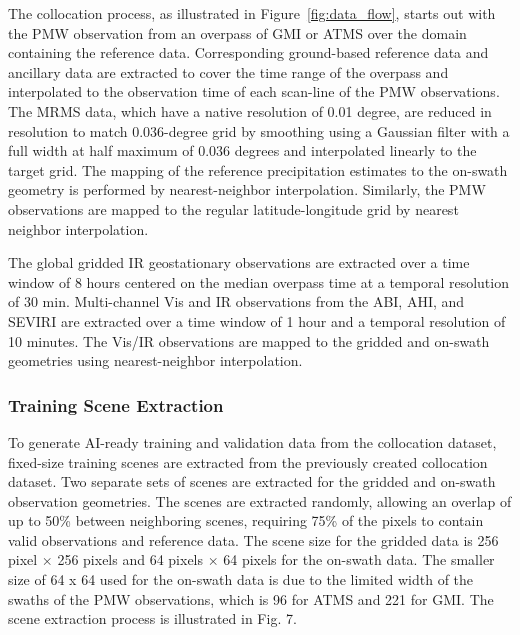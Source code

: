 \documentclass[11pt]{article}
\begin{document}
The collocation process, as illustrated in Figure~\ref{fig:data_flow}, starts
out with the PMW observation from an overpass of GMI or ATMS over the domain
containing the reference data. Corresponding ground-based reference data and
ancillary data are extracted to cover the time range of the overpass and
interpolated to the observation time of each scan-line of the PMW observations.
The MRMS data, which have a native resolution of 0.01 degree, are reduced in
resolution to match 0.036-degree grid by smoothing using a Gaussian filter with
a full width at half maximum of 0.036 degrees and interpolated linearly to the
target grid. The mapping of the reference precipitation estimates to the
on-swath geometry is performed by nearest-neighbor interpolation. Similarly, the
PMW observations are mapped to the regular latitude-longitude grid by nearest
neighbor interpolation.

The global gridded IR geostationary observations are extracted over a time
window of 8 hours centered on the median overpass time at a temporal resolution
of 30 min. Multi-channel Vis and IR observations from the ABI, AHI, and SEVIRI
are extracted over a time window of 1 hour and a temporal resolution of 10
minutes. The Vis/IR observations are mapped to the gridded and on-swath
geometries using nearest-neighbor interpolation.

\subsubsection{Training Scene Extraction}

To generate AI-ready training and validation data from the collocation dataset,
fixed-size training scenes are extracted from the previously created collocation
dataset. Two separate sets of scenes are extracted for the gridded and on-swath
observation geometries. The scenes are extracted randomly, allowing an overlap
of up to 50\% between neighboring scenes, requiring 75\% of the pixels to
contain valid observations and reference data. The scene size for the gridded
data is 256 pixel $\times$ 256 pixels and 64 pixels $\times$ 64 pixels for the
on-swath data. The smaller size of 64 x 64 used for the on-swath data is due to
the limited width of the swaths of the PMW observations, which is 96 for ATMS
and 221 for GMI. The scene extraction process is illustrated in Fig. 7.
\end{document}
